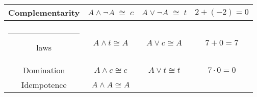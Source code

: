 \begin{tabular}{c|c|c|c}
\begin{minipage}{.25\textwidth} \rule{0pt}{22pt}\index{complementarity law}Complementarity\rule[-10pt]{0pt}{10pt} \end{minipage} & 
\begin{minipage}{.25\textwidth} \centerline{$A \land {\lnot}A \; \cong \; c$} \end{minipage} & 
\begin{minipage}{.25\textwidth} \centerline{$A \lor {\lnot}A \; \cong \; t$} \end{minipage} &  
\begin{minipage}{.25\textwidth} \centerline{$2 + (-2) = 0$} \end{minipage} \\ \hline 
\begin{minipage}{.25\textwidth} \rule{0pt}{22pt}\index{identity law}Identity \\ \rule{12pt}{0pt} laws\rule[-10pt]{0pt}{10pt} \end{minipage} & 
\begin{minipage}{.25\textwidth} \centerline{$A \land t \cong A$} \end{minipage} & 
\begin{minipage}{.25\textwidth} \centerline{$A \lor c \cong A$} \end{minipage} & 
\begin{minipage}{.25\textwidth} \centerline{$7 + 0 = 7$} \end{minipage}\\ \hline 
\begin{minipage}{.25\textwidth} \rule{0pt}{22pt}\index{domination law}Domination\rule[-10pt]{0pt}{10pt} \end{minipage} & 
\begin{minipage}{.25\textwidth}  \centerline{$A \land c \cong c$} \end{minipage} & 
\begin{minipage}{.25\textwidth} \centerline{$A \lor t \cong t$} \end{minipage} & 
\begin{minipage}{.25\textwidth} \centerline{$7 \cdot 0 = 0$} \end{minipage}\\ \hline
\begin{minipage}{.25\textwidth} \rule{0pt}{22pt}\index{idempotence}Idempotence\rule[-10pt]{0pt}{10pt} \end{minipage} & 
\begin{minipage}{.25\textwidth} \centerline{$A \land A \cong A$} \end{minipage} & 

\end{tabular}
